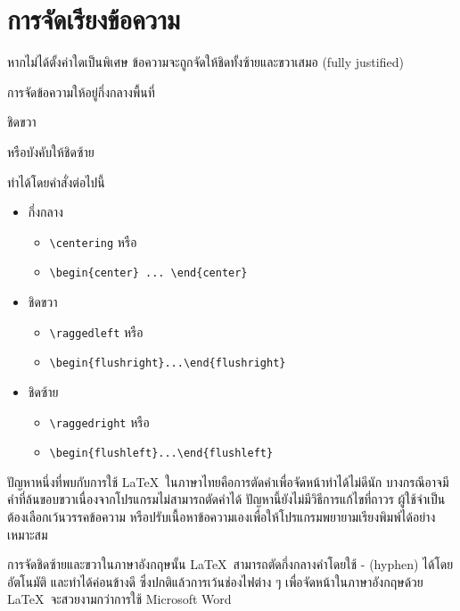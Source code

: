 \section{การจัดเรียงข้อความ}
หากไม่ได้ตั้งค่าใดเป็นพิเศษ ข้อความจะถูกจัดให้ชิดทั้งซ้ายและขวาเสมอ (fully justified)
\begin{center}การจัดข้อความให้อยู่กึ่งกลางพื้นที่\end{center}
\begin{flushright}ชิดขวา\end{flushright}
\begin{flushleft}หรือบังคับให้ชิดซ้าย\end{flushleft}
ทำได้โดยคำสั่งต่อไปนี้
\begin{itemize}
	\item กึ่งกลาง
	\begin{itemize}[label=$\circ$]
		\item \lstinline|\centering| หรือ
		\item \lstinline|\begin{center} ... \end{center}|
	\end{itemize}
	\item ชิดขวา
	\begin{itemize}[label=$\circ$]
		\item \lstinline|\raggedleft| หรือ
		\item \lstinline|\begin{flushright}...\end{flushright}|
	\end{itemize}
	\item ชิดซ้าย
	\begin{itemize}[label=$\circ$]
		\item \lstinline|\raggedright| หรือ
		\item \lstinline|\begin{flushleft}...\end{flushleft}|
	\end{itemize}
\end{itemize}

ปัญหาหนึ่งที่พบกับการใช้ \LaTeX~ในภาษาไทยคือการตัดคำเพื่อจัดหน้าทำได้ไม่ดีนัก บางกรณีอาจมีคำที่ล้นขอบขวาเนื่องจากโปรแกรมไม่สามารถตัดคำได้ ปัญหานี้ยังไม่มีวิธีการแก้ไขที่ถาวร ผู้ใช้จำเป็นต้องเลือกเว้นวรรคข้อความ หรือปรับเนื้อหาข้อความเองเพื่อให้โปรแกรมพยายามเรียงพิมพ์ได้อย่างเหมาะสม

การจัดชิดซ้ายและขวาในภาษาอังกฤษนั้น \LaTeX~สามารถตัดกึ่งกลางคำโดยใช้ - (hyphen) ได้โดยอัตโนมัติ และทำได้ค่อนข้างดี ซึ่งปกติแล้วการเว้นช่องไฟต่าง ๆ เพื่อจัดหน้าในภาษาอังกฤษด้วย \LaTeX~จะสวยงามกว่าการใช้ Microsoft Word

